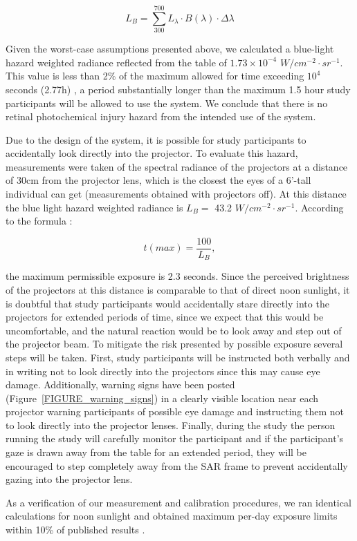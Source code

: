 \documentclass[10pt]{article}
\begin{document}
\[L_B = \sum_{300}^{700}L_{\lambda}\cdot B(\lambda)\cdot \Delta \lambda\]

Given the worst-case assumptions presented above, we calculated a
blue-light hazard weighted radiance reflected from the table of
$1.73\times10^{-4}$ $W/cm^{-2}\cdot sr^{-1}$.  This value is less than
2\% of the maximum allowed for time exceeding $10^4$ seconds (2.77h)
\cite{ANSI}, a period substantially longer than the maximum 1.5 hour
study participants will be allowed to use the system.  We conclude
that there is no retinal photochemical injury hazard from the intended
use of the system.

Due to the design of the system, it is possible for study participants
to accidentally look directly into the projector.  To evaluate this
hazard, measurements were taken of the spectral radiance of the
projectors at a distance of 30cm from the projector lens, which is the
closest the eyes of a 6'-tall individual can get (measurements
obtained with projectors off). At this distance the blue light hazard
weighted radiance is $L_B = $ 43.2 $W/cm^{-2}\cdot sr^{-1}$. According
to the formula \cite{ANSI}:

\[t(max) = \frac{100}{L_B},\]

\noindent
the maximum permissible exposure is 2.3 seconds.  Since the perceived
brightness of the projectors at this distance is comparable to that of
direct noon sunlight, it is doubtful that study participants would
accidentally stare directly into the projectors for extended periods
of time, since we expect that this would be uncomfortable, and the
natural reaction would be to look away and step out of the projector
beam.  To mitigate the risk presented by possible exposure several
steps will be taken.  First, study participants will be instructed
both verbally and in writing not to look directly into the projectors
since this may cause eye damage.  Additionally, warning signs have
been posted (Figure~\ref{FIGURE_warning_signs}) in a clearly visible
location near each projector warning participants of possible eye
damage and instructing them not to look directly into the projector
lenses.  Finally, during the study the person running the study will
carefully monitor the participant and if the participant's gaze is
drawn away from the table for an extended period, they will be
encouraged to step completely away from the SAR frame to prevent
accidentally gazing into the projector lens.

As a verification of our measurement and calibration procedures, we
ran identical calculations for noon sunlight and obtained maximum
per-day exposure limits within 10\% of published results
\cite{Okuno08}.
\end{document}
